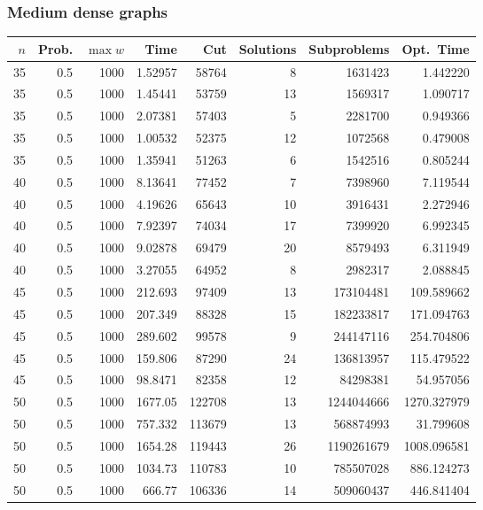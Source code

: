 \documentclass[a4paper,11pt]{article}
\begin{document}
\subsubsection{Medium dense graphs}

\begin{table}
\begin{center}
\begin{tabular}{|rrr|r|r|rr|r|}
\hline
$n$ & Prob. & $\max w$ & Time & Cut & Solutions & Subproblems & Opt.\ Time \\
\hline
35 & 0.5 & 1000 & 1.52957 & 58764 & 8 & 1631423 & 1.442220 \\
35 & 0.5 & 1000 & 1.45441 & 53759 & 13 & 1569317 & 1.090717 \\
35 & 0.5 & 1000 & 2.07381 & 57403 & 5 & 2281700 & 0.949366 \\
35 & 0.5 & 1000 & 1.00532 & 52375 & 12 & 1072568 & 0.479008 \\
35 & 0.5 & 1000 & 1.35941 & 51263 & 6 & 1542516 & 0.805244 \\
40 & 0.5 & 1000 & 8.13641 & 77452 & 7 & 7398960 & 7.119544 \\
40 & 0.5 & 1000 & 4.19626 & 65643 & 10 & 3916431 & 2.272946 \\
40 & 0.5 & 1000 & 7.92397 & 74034 & 17 & 7399920 & 6.992345 \\
40 & 0.5 & 1000 & 9.02878 & 69479 & 20 & 8579493 & 6.311949 \\
40 & 0.5 & 1000 & 3.27055 & 64952 & 8 & 2982317 & 2.088845 \\
45 & 0.5 & 1000 & 212.693 & 97409 & 13 & 173104481 & 109.589662 \\
45 & 0.5 & 1000 & 207.349 & 88328 & 15 & 182233817 & 171.094763 \\
45 & 0.5 & 1000 & 289.602 & 99578 & 9 & 244147116 & 254.704806 \\
45 & 0.5 & 1000 & 159.806 & 87290 & 24 & 136813957 & 115.479522 \\
45 & 0.5 & 1000 & 98.8471 & 82358 & 12 & 84298381 & 54.957056 \\
50 & 0.5 & 1000 & 1677.05 & 122708 & 13 & 1244044666 & 1270.327979 \\
50 & 0.5 & 1000 & 757.332 & 113679 & 13 & 568874993 & 31.799608 \\
50 & 0.5 & 1000 & 1654.28 & 119443 & 26 & 1190261679 & 1008.096581 \\
50 & 0.5 & 1000 & 1034.73 & 110783 & 10 & 785507028 & 886.124273 \\
50 & 0.5 & 1000 & 666.77 & 106336 & 14 & 509060437 & 446.841404 \\

\end{tabular}
\end{center}
\end{table}
\end{document}
